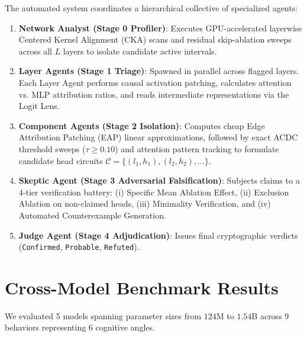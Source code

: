 \documentclass[10pt,a4paper]{article}
\begin{document}
The automated system coordinates a hierarchical collective of specialized agents:
\begin{enumerate}[leftmargin=*]
    \item \textbf{Network Analyst (Stage 0 Profiler)}: Executes GPU-accelerated layerwise Centered Kernel Alignment (CKA) scans and residual skip-ablation sweeps across all $L$ layers to isolate candidate active intervals.
    \item \textbf{Layer Agents (Stage 1 Triage)}: Spawned in parallel across flagged layers. Each Layer Agent performs causal activation patching, calculates attention vs. MLP attribution ratios, and reads intermediate representations via the Logit Lens.
    \item \textbf{Component Agents (Stage 2 Isolation)}: Computes cheap Edge Attribution Patching (EAP) linear approximations, followed by exact ACDC threshold sweeps ($\tau \ge 0.10$) and attention pattern tracking to formulate candidate head circuits $\mathcal{C} = \{(l_1, h_1), (l_2, h_2), \dots\}$.
    \item \textbf{Skeptic Agent (Stage 3 Adversarial Falsification)}: Subjects claims to a 4-tier verification battery: (i) Specific Mean Ablation Effect, (ii) Exclusion Ablation on non-claimed heads, (iii) Minimality Verification, and (iv) Automated Counterexample Generation.
    \item \textbf{Judge Agent (Stage 4 Adjudication)}: Issues final cryptographic verdicts (\texttt{Confirmed}, \texttt{Probable}, \texttt{Refuted}).
\end{enumerate}

\section{Cross-Model Benchmark Results}

We evaluated 5 models spanning parameter sizes from $124\text{M}$ to $1.54\text{B}$ across 9 behaviors representing 6 cognitive angles.
\end{document}
